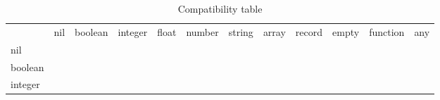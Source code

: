 \begin{table}[!h]
    \caption{Compatibility table}
    \tiny
 \begin{tabular}{ m{1.1cm} m{0.95cm} m{0.95cm} m{0.95cm} m{0.95cm} m{0.95cm} m{0.95cm} m{0.95cm} m{0.95cm} m{0.95cm} m{0.95cm} m{0.95cm}} 

            & nil                                           & boolean                                                              & integer                                       & float                                         & number                                        & string                                        & array                                         & record                                        & empty                                         & function                                      & any                   \\ \cline{2-12} 
\multicolumn{1}{l|}{nil}      & \multicolumn{1}{l|}{\cellcolor[HTML]{036400}} & \multicolumn{1}{l|}{\cellcolor[HTML]{036400}{\color[HTML]{000000} }} & \multicolumn{1}{l|}{\cellcolor[HTML]{036400}} & \multicolumn{1}{l|}{\cellcolor[HTML]{036400}} & \multicolumn{1}{l|}{\cellcolor[HTML]{036400}} & \multicolumn{1}{l|}{\cellcolor[HTML]{036400}} & \multicolumn{1}{l|}{\cellcolor[HTML]{036400}} & \multicolumn{1}{l|}{\cellcolor[HTML]{036400}} & \multicolumn{1}{l|}{\cellcolor[HTML]{036400}} & \multicolumn{1}{l|}{\cellcolor[HTML]{036400}} & \multicolumn{1}{l|}{} \\ \cline{2-12} 
\multicolumn{1}{l|}{boolean}  & \multicolumn{1}{l|}{\cellcolor[HTML]{036400}} & \multicolumn{1}{l|}{\cellcolor[HTML]{036400}}                        & \multicolumn{1}{l|}{}                         & \multicolumn{1}{l|}{}                         & \multicolumn{1}{l|}{}                         & \multicolumn{1}{l|}{}                         & \multicolumn{1}{l|}{}                         & \multicolumn{1}{l|}{}                         & \multicolumn{1}{l|}{}                         & \multicolumn{1}{l|}{}                         & \multicolumn{1}{l|}{} \\ \cline{2-12} 
\multicolumn{1}{l|}{integer}  & \multicolumn{1}{l|}{\cellcolor[HTML]{036400}} & \multicolumn{1}{l|}{}                                                & \multicolumn{1}{l|}{\cellcolor[HTML]{036400}} & \multicolumn{1}{l|}{\cellcolor[HTML]{036400}} & \multicolumn{1}{l|}{\cellcolor[HTML]{036400}} & \multicolumn{1}{l|}{}                         & \multicolumn{1}{l|}{}                         & \multicolumn{1}{l|}{}                         & \multicolumn{1}{l|}{}                         & \multicolumn{1}{l|}{}                         & \multicolumn{1}{l|}{} \\ \cline{2-12} 

\end{tabular}
\end{table}
